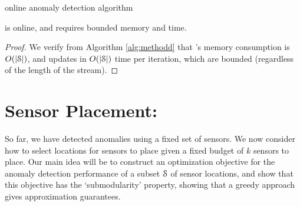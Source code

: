 \begin{algorithm}[h!] 
	\caption{\methodD online anomaly detection algorithm}
	\label{alg:methodd}
\end{algorithm}

\begin{lemma}
\methodD is online, and requires bounded memory and time.
\end{lemma}
\begin{proof}
We verify from Algorithm \ref{alg:methodd} that \methodD's memory consumption is $O(|\S|)$, and updates in $O(|\S|)$ time per iteration, which are bounded (regardless of the length of the stream). 
\end{proof}

\section{Sensor Placement: \method} \label{sec:sensor}

So far, we have detected anomalies using a fixed set of sensors. We now consider how to select locations for sensors to place given a fixed budget of $k$ sensors to place. Our main idea will be to construct an optimization objective for the anomaly detection performance of a subset $\S$ of sensor locations, and show that this objective has the `submodularity' property, showing that a greedy approach gives approximation guarantees. 

